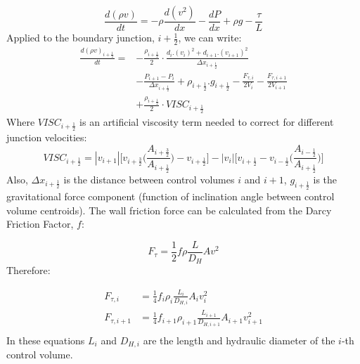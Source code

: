 \documentclass[11pt,letterpaper,titlepage]{article}
\newcommand{\half}{\frac{1}{2}}
\begin{document}
\begin{equation*}
\frac{d(\rho v)}{dt}=-\rho \frac{d(v^2)}{dx} -\frac{dP}{dx}+\rho g - \frac{\tau}{L}
\end{equation*}
\newline
Applied to the boundary junction, $i+\half$, we can write:
\begin{equation}
\begin{aligned}
\frac{d(\rho v)_{i+\half}}{dt}=&-\frac{\rho_{i+\half}}{2}\cdot\frac{d_i.(v_{i})^2+d_{i+1}.(v_{i+1})^2}{\Delta x_{i+\half}} \\
&-\frac{P_{i+1}-P_i}{\Delta x_{i+\half}} + \rho_{i+\half}.g_{i+\half}-\frac{F_{\tau,i}}{2V_i}-\frac{F_{\tau,i+1}}{2V_{i+1}} \\
&+\frac{\rho_{i+\half}}{2}\cdot VISC_{i+\half}
\end{aligned}
\end{equation}
\newline
Where $VISC_{i+\half}$ is an artificial viscosity term needed to correct for different junction velocities:
\begin{equation*}
VISC_{i+\half}=|v_{i+1}|\biggr[ v_{i+\frac{3}{2}} \biggr(\frac{A_{i+\frac{3}{2}}}{A_{i+\half}} \biggr) - v_{i+\half}       \biggr] - 
|v_{i}|\biggr[ v_{i+\half}  - v_{i-\half} \biggr(\frac{A_{i-\half}}{A_{i+\half}} \biggr)      \biggr]
\end{equation*}
\noindent 
Also, $\Delta x_{i+\half}$ is the distance between control volumes $i$ and $i+1$, $g_{i+\half}$ is the gravitational force component (function of inclination angle between control volume centroids). The wall friction force can be calculated from the Darcy Friction Factor, $f$:

\begin{equation*}
F_{\tau}=\half f \rho \frac{L}{D_H} A v^2
\end{equation*} 
\noindent Therefore:

\begin{equation*}
\begin{aligned}
F_{\tau,i}&=\frac{1}{4} f_i \rho_i \frac{L_i}{D_{H,i}}A_i v_i^2 \\
F_{\tau,i+1}&=\frac{1}{4} f_{i+1} \rho_{i+1} \frac{L_{i+1}}{D_{H,i+1}}A_{i+1} v_{i+1}^2 \\
\end{aligned}
\end{equation*}
\newline
\noindent
In these equations $L_i$ and $D_{H,i}$ are the length and hydraulic diameter of the $i$-th control volume.
\end{document}
